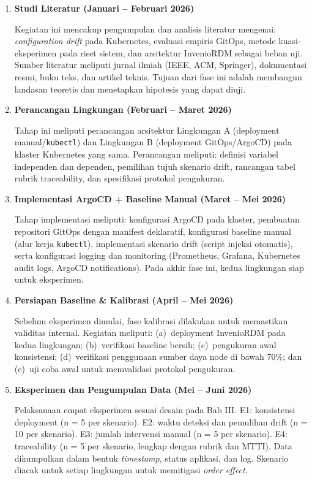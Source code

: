 \begin{enumerate}
    \item \textbf{Studi Literatur (Januari -- Februari 2026)}
    
    Kegiatan ini mencakup pengumpulan dan analisis literatur mengenai: \textit{configuration drift} pada Kubernetes, evaluasi empiris GitOps, metode kuasi-eksperimen pada riset sistem, dan arsitektur InvenioRDM sebagai beban uji. Sumber literatur meliputi jurnal ilmiah (IEEE, ACM, Springer), dokumentasi resmi, buku teks, dan artikel teknis. Tujuan dari fase ini adalah membangun landasan teoretis dan menetapkan hipotesis yang dapat diuji.
    
    \item \textbf{Perancangan Lingkungan (Februari -- Maret 2026)}
    
    Tahap ini meliputi perancangan arsitektur Lingkungan A (deployment manual/\texttt{kubectl}) dan Lingkungan B (deployment GitOps/ArgoCD) pada klaster Kubernetes yang sama. Perancangan meliputi: definisi variabel independen dan dependen, pemilihan tujuh skenario drift, rancangan tabel rubrik traceability, dan spesifikasi protokol pengukuran.
    
    \item \textbf{Implementasi ArgoCD + Baseline Manual (Maret -- Mei 2026)}
    
    Tahap implementasi meliputi: konfigurasi ArgoCD pada klaster, pembuatan repositori GitOps dengan manifest deklaratif, konfigurasi baseline manual (alur kerja \texttt{kubectl}), implementasi skenario drift (script injeksi otomatis), serta konfigurasi logging dan monitoring (Prometheus, Grafana, Kubernetes audit logs, ArgoCD notifications). Pada akhir fase ini, kedua lingkungan siap untuk eksperimen.
    
    \item \textbf{Persiapan Baseline \& Kalibrasi (April -- Mei 2026)}
    
    Sebelum eksperimen dimulai, fase kalibrasi dilakukan untuk memastikan validitas internal. Kegiatan meliputi: (a)~deployment InvenioRDM pada kedua lingkungan; (b)~verifikasi baseline bersih; (c)~pengukuran awal konsistensi; (d)~verifikasi penggunaan sumber daya node di bawah 70\%; dan (e)~uji coba awal untuk memvalidasi protokol pengukuran.
    
    \item \textbf{Eksperimen dan Pengumpulan Data (Mei -- Juni 2026)}
    
    Pelaksanaan empat eksperimen sesuai desain pada Bab III. E1: konsistensi deployment (n = 5 per skenario). E2: waktu deteksi dan pemulihan drift (n = 10 per skenario). E3: jumlah intervensi manual (n = 5 per skenario). E4: traceability (n = 5 per skenario, lengkap dengan rubrik dan MTTI). Data dikumpulkan dalam bentuk \textit{timestamp}, status aplikasi, dan log. Skenario diacak untuk setiap lingkungan untuk memitigasi \textit{order effect}.
    

\end{enumerate}
